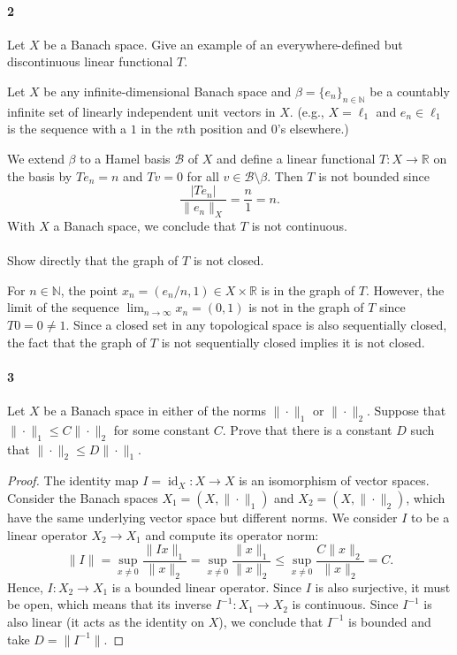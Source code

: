 \documentclass[12pt]{article}
\newlength{\myparskip}
\newenvironment{fullbox}{\begin{lrbox}{\savefullbox}\begin{minipage}{\dimexpr\textwidth-2\fboxsep\relax}\setlength{\parskip}{\myparskip}}{\end{minipage}\end{lrbox}\framebox[\textwidth]{\usebox{\savefullbox}}}
\newenvironment{pbox}[1][]{\begin{fullbox}\def\temp{#1}\ifx\temp\empty\else\paragraph{#1}\phantom{}\fi}{\end{fullbox}}
\theoremstyle{definition}
\newcommand{\N}{\mathbb{N}}
\newcommand{\R}{\mathbb{R}}
\newcommand{\<}{\langle}
\renewcommand{\>}{\rangle}
\DeclareMathOperator{\id}{id}
\begin{document}
\newpage
\begin{pbox}[2]
    Let $X$ be a Banach space.
    Give an example of an everywhere-defined but discontinuous linear functional $T$.
\end{pbox}

Let $X$ be any infinite-dimensional Banach space and $\beta = \{e_n\}_{n \in \N}$ be a countably infinite set of linearly independent unit vectors in $X$.
(e.g., $X = \ell_1$ and $e_n \in \ell_1$ is the sequence with a $1$ in the $n$th position and $0$'s elsewhere.)

We extend $\beta$ to a Hamel basis $\mathcal{B}$ of $X$ and define a linear functional $T : X \to \R$ on the basis by $Te_n = n$ and $Tv = 0$ for all $v \in \mathcal{B} \setminus \beta$.
Then $T$ is not bounded since
\[
    \frac{|Te_n|}{\|e_n\|_X} = \frac{n}{1} = n.
\]
With $X$ a Banach space, we conclude that $T$ is not continuous.



\begin{pbox}
    Show directly that the graph of $T$ is not closed.
\end{pbox}

For $n \in \N$, the point $x_n = (e_n/n, 1) \in X \times \R$ is in the graph of $T$.
However, the limit of the sequence $\lim_{n \to \infty} x_n = (0, 1)$ is not in the graph of $T$ since $T0 = 0 \ne 1$.
Since a closed set in any topological space is also sequentially closed, the fact that the graph of $T$ is not sequentially closed implies it is not closed.


\newpage
\begin{pbox}[3]
    Let $X$ be a Banach space in either of the norms $\|{\cdot}\|_1$ or $\|{\cdot}\|_2$.
    Suppose that $\|{\cdot}\|_1 \leq C\|{\cdot}\|_2$ for some constant $C$.
    Prove that there is a constant $D$ such that $\|{\cdot}\|_2 \leq D\|{\cdot}\|_1$.
\end{pbox}

\begin{proof}
    The identity map $I = \id_X : X \to X$ is an isomorphism of vector spaces.
    Consider the Banach spaces $X_1 = (X, \|{\cdot}\|_1)$ and $X_2 = (X, \|{\cdot}\|_2)$, which have the same underlying vector space but different norms.
    We consider $I$ to be a linear operator $X_2 \to X_1$ and compute its operator norm:
    \[
        \|I\|
            = \sup_{x \ne 0} \frac{\|Ix\|_1}{\|x\|_2}
            = \sup_{x \ne 0} \frac{\|x\|_1}{\|x\|_2}
            \leq \sup_{x \ne 0} \frac{C\|x\|_2}{\|x\|_2}
            = C.
    \]
    Hence, $I : X_2 \to X_1$ is a bounded linear operator.
    Since $I$ is also surjective, it must be open, which means that its inverse $I^{-1} : X_1 \to X_2$ is continuous.
    Since $I^{-1}$ is also linear (it acts as the identity on $X$), we conclude that $I^{-1}$ is bounded and take $D = \|I^{-1}\|$.
\end{proof}
\end{document}
